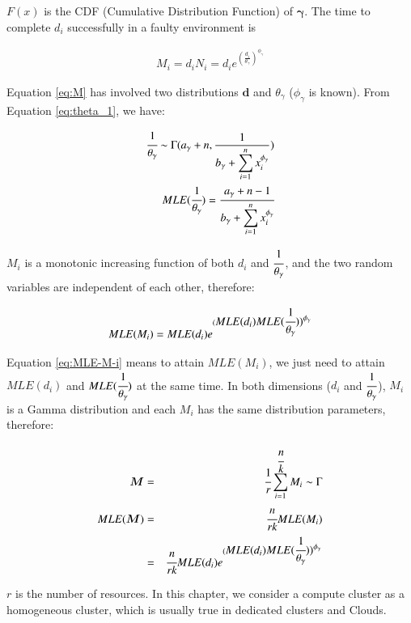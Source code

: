 $F(x)$ is the CDF (Cumulative Distribution Function) of $\bm\gamma$. The time to complete $d_i$ successfully in a faulty environment is

\begin{eqnarray}
\displaystyle
M_i=d_iN_i=d_ie^{(\displaystyle\frac{d_i}{\theta_{\gamma}})^{\phi_{\gamma}}} 
\label{eq:M}
\end{eqnarray}

Equation \ref{eq:M} has involved two distributions $\bm d$ and $\theta_{\gamma}$ ($\phi_{\gamma}$ is known). From Equation \ref{eq:theta_1}, we have:

\begin{eqnarray}
\displaystyle\cfrac{1}{\theta_{\gamma}}\sim\Gamma(a_{\gamma}+n,\frac{1}{\displaystyle b_{\gamma}+\sum_{i=1}^n{x_i^{\phi_{\gamma}}}}) \\
MLE(\displaystyle\cfrac{1}{\theta_{\gamma}})=\displaystyle\cfrac{a_{\gamma}+n-1}{\displaystyle b_{\gamma}+\sum_{i=1}^n{x_i^{\phi_{\gamma}}}}
 \end{eqnarray}

$M_i$ is a monotonic increasing function of both $d_i$ and $\displaystyle\cfrac{1}{\theta_{\gamma}}$, and the two random variables are independent of each other, therefore:


\begin{equation} 
\label{eq:MLE-M-i}
MLE(M_i)=MLE(d_i)e^{(\displaystyle MLE(d_i)MLE(\cfrac{1}{\theta_{\gamma}}))^{\phi_{\gamma}}} 
\end{equation}

Equation \ref{eq:MLE-M-i} means to attain $MLE(M_i)$, we just need to attain $MLE(d_i)$ and $MLE(\cfrac{1}{\theta_{\gamma}})$ at the same time. 
In both dimensions ($d_i$ and $\displaystyle\cfrac{1}{\theta_{\gamma}}$), $M_i$ is a Gamma distribution and each $M_i$ has the same distribution parameters, therefore:

\begin{eqnarray} 
\label{eq:MLE-M}
\bm{M}&=&\displaystyle\cfrac{1}{r}\sum_{i=1}^{\cfrac{n}{k}}M_i\sim\Gamma \nonumber\\
MLE(\bm{M})&=&\displaystyle\cfrac{n}{rk}MLE(M_i)\\
&=&\displaystyle\cfrac{n}{rk} MLE(d_i)e^{(\displaystyle MLE(d_i)MLE(\cfrac{1}{\theta_{\gamma}}))^{\phi_{\gamma}}} 
\end{eqnarray}

$r$ is the number of resources. In this chapter, we consider a compute cluster as a homogeneous cluster, which is usually true in dedicated clusters and Clouds. 

